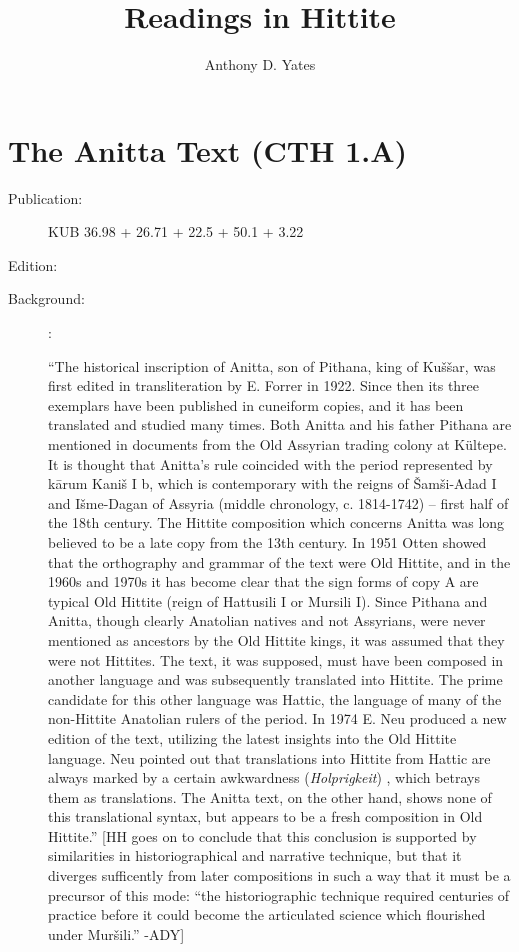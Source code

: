 \documentclass[10pt]{article}
\title{Readings in Hittite}
\author{Anthony D. Yates}
\date{}
\renewcommand{\.}[1]{\textsubdot{#1}}
\begin{document}
\maketitle
\thispagestyle{empty}



\section{The Anitta Text (CTH 1.A)}

\begin{description}

\item[Publication:] KUB 36.98 + 26.71 + 22.5 + 50.1 + 3.22
\item[Edition:] \citet{neu1974anitta}
\item[Background:] \citet[291-93]{hoffner1980historians}: 

``The historical inscription of Anitta, son of Pithana, king of Ku\v{s}\v{s}ar, was first edited in transliteration by E. Forrer in 1922. Since then its three exemplars have been published in cuneiform copies, and it has been translated and studied many times. Both Anitta and his father Pithana are mentioned in documents from the Old Assyrian trading colony at K\"ultepe. It is thought that Anitta's rule coincided with the period represented by k\=arum Kani\v{s} I b, which is contemporary with the reigns of
\v{S}am\v{s}i-Adad I and I\v{s}me-Dagan of Assyria (middle chronology, c. 1814-1742) -- first half of the 18th century. The Hittite composition which concerns Anitta was long believed to be a late copy from the 13th century. In 1951 Otten showed that the orthography and grammar of the text were Old Hittite, and in the 1960s and 1970s it has become clear that the sign forms of copy A are typical Old Hittite (reign of Hattusili I or Mursili I). Since Pithana and Anitta, though clearly Anatolian natives and not Assyrians, were never mentioned as ancestors by the Old Hittite kings, it was assumed that they were not Hittites. The text, it was supposed, must have been composed in another language and was subsequently translated into Hittite. The prime candidate for this other language was Hattic, the language of many of the non-Hittite Anatolian rulers of the period. In 1974 E. Neu produced a new edition of the text, utilizing the latest insights into the Old Hittite language. Neu pointed out that translations into Hittite from Hattic are always marked by a certain awkwardness (\textit{Holprigkeit}) , which betrays them as translations. The Anitta text, on the other hand, shows none of this translational syntax, but appears to be a fresh composition in Old Hittite.''
[HH goes on to conclude that this conclusion is supported by similarities in historiographical and narrative technique, but that it diverges sufficently from later compositions in such a way that it must be a precursor of this mode: ``the historiographic technique required centuries of practice before it could become the articulated science which flourished under Mur\v{s}ili.'' -ADY]


\end{description}
\end{document}
